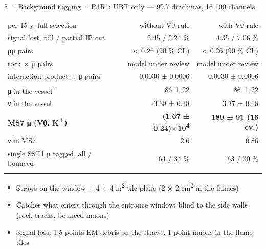 \begin{btframe}{5 · Background tagging · R1}{R1: UBT only — 99.7 drachmas, 18 100 channels}
{\centering {}\par}
\vspace{2.46pt}
\noindent \begin{minipage}[c]{0.5\linewidth}
{\fontsize{5.31pt}{6.90pt}\selectfont\setlength{\tabcolsep}{3.72pt}\renewcommand{\arraystretch}{1.42}
\begin{tabular}{lrr}
\textcolor{muted}{per 15 y, full selection} & \textcolor{muted}{without V0 rule} & \textcolor{muted}{with V0 rule} \\\headrule
signal lost, full / partial IP cut & 2.45 / 2.24 \% & 4.35 / 7.06 \% \\\rowrule
μμ pairs & < 0.26 (90 \% CL) & < 0.26 (90 \% CL) \\\rowrule
rock × μ pairs & \textcolor{muted}{model under review} & \textcolor{muted}{model under review} \\\rowrule
interaction product × μ pairs & 0.0030 ± 0.0006 & 0.0030 ± 0.0006 \\\rowrule
μ in the vessel \textsuperscript{*} & 86 ± 22 & 86 ± 22 \\\rowrule
ν in the vessel & 3.38 ± 0.18 & 3.37 ± 0.18 \\\rowrule
\rowcolor{tint}\bfseries MS7 μ (V0, K\textsuperscript{±}) & \bfseries (1.67 ± 0.24)×10\textsuperscript{4} & \bfseries 189 ± 91 (16 ev.) \\\rowrule
ν in MS7 & 2.6 & 0.86 \\\rowrule
single SST1 μ tagged, all / bounced & 64 / 34 \% & 63 / 30 \% \\\rowrule
\end{tabular}\par}
\end{minipage}%
\hfill%
\begin{minipage}[c]{0.5\linewidth}
{\fontsize{6.15pt}{8.60pt}\selectfont
\begin{itemize}
  \item Straws on the window + 4 × 4 m\textsuperscript{2} tile plane (2 × 2 cm\textsuperscript{2} in the flames)
  \item Catches what enters through the entrance window; blind to the side walls (rock tracks, bounced muons)
  \item Signal loss: 1.5 points EM debris on the straws, 1 point muons in the flame tiles

\end{itemize}}
\end{minipage}
\end{btframe}
